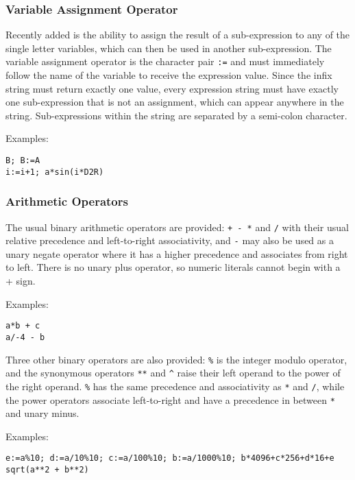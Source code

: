 \subsubsection{Variable Assignment Operator}

Recently added is the ability to assign the result of a sub-expression to any of the single letter variables, which can then be 
used in another sub-expression. The variable assignment operator is the character pair \verb|:=| and must immediately follow 
the name of the variable to receive the expression value. Since the infix string must return exactly one value, every 
expression string must have exactly one sub-expression that is not an assignment, which can appear anywhere in the 
string. Sub-expressions within the string are separated by a semi-colon character.

Examples:

\begin{verbatim}
B; B:=A
i:=i+1; a*sin(i*D2R)
\end{verbatim}

\subsubsection{Arithmetic Operators}

The usual binary arithmetic operators are provided: \verb|+ - *| and \verb|/| with their usual relative precedence and left-to-right 
associativity, and \verb|-| may also be used as a unary negate operator where it has a higher precedence and associates from 
right to left. There is no unary plus operator, so numeric literals cannot begin with a + sign.

Examples:

\begin{verbatim}
a*b + c
a/-4 - b
\end{verbatim}

Three other binary operators are also provided: \verb|%| is the integer modulo operator, and the synonymous operators \verb|**| and \verb|^| 
raise their left operand to the power of the right operand. \verb|%| has the same precedence and associativity as \verb|*| and \verb|/|, while 
the power operators associate left-to-right and have a precedence in between \verb|*| and unary minus.

Examples:

\begin{verbatim}
e:=a%10; d:=a/10%10; c:=a/100%10; b:=a/1000%10; b*4096+c*256+d*16+e
sqrt(a**2 + b**2)
\end{verbatim}

